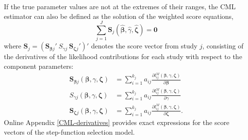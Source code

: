 \documentclass[
  american,
  man, donotrepeattitle,floatsintext]{apa7}
\begin{document}
If the true parameter values are not at the extremes of their ranges, the CML estimator can also be defined as the solution of the weighted score equations,
\begin{equation}
\sum_{j=1}^J \mathbf{S}_{j}\left(\boldsymbol{\hat\beta}, \hat\gamma, \boldsymbol{\hat\zeta}\right) = \mathbf{0}
\end{equation}
where \(\mathbf{S}_j = \left(\mathbf{S}_{\boldsymbol\beta j}' \  S_{\gamma j} \ \mathbf{S}_{\boldsymbol\zeta j}'\right)'\) denotes the score vector from study \(j\), consisting of the derivatives of the likelihood contributions for each study with respect to the component parameters:
\begin{align}
\mathbf{S}_{\boldsymbol\beta j}\left(\boldsymbol{\beta}, \gamma, \boldsymbol{\zeta}\right) &= \sum_{i=1}^{k_j} a_{ij} \frac{\partial l^M_{ij}\left(\boldsymbol\beta, \gamma, \boldsymbol\zeta\right)}{\partial \boldsymbol\beta} \label{eq:score-M-beta} \\
S_{\gamma j}\left(\boldsymbol{\beta}, \gamma, \boldsymbol{\zeta}\right) &= \sum_{i=1}^{k_j} a_{ij} \frac{\partial l^M_{ij}\left(\boldsymbol\beta, \gamma, \boldsymbol\zeta\right)}{\partial \gamma} \label{eq:score-M-gamma} \\
\mathbf{S}_{\boldsymbol\zeta j}\left(\boldsymbol{\beta}, \gamma, \boldsymbol{\zeta}\right) &= \sum_{i=1}^{k_j} a_{ij} \frac{\partial l^M_{ij}\left(\boldsymbol\beta, \gamma, \boldsymbol\zeta\right)}{\partial \boldsymbol\zeta}. \label{eq:score-M-zeta} 
\end{align}
Online Appendix \ref{CML-derivatives} provides exact expressions for the score vectors of the step-function selection model.
\end{document}
